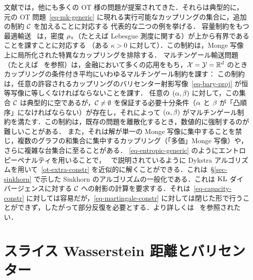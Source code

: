 文献では，他にも多くの OT 様の問題が提案されてきた．それらは典型的に，元の OT 問題~\eqref{eq-mk-generic} に現れる実行可能なカップリングの集合に，追加の制約 $\mathcal{C}$ を加えることに対応する
代表的な二つの例を挙げる．
%
容量制約をもつ最適輸送~\citep{km1} は，密度 $\rho_{\pi}$（たとえば Lebesgue 測度に関する）が上から有界であることを課すことに対応する
\eql{\label{eq-capacity-constr}
	\Cc = \enscond{ \pi }{ \density{\pi} \leq \kappa }
}
（ある $\kappa>0$ に対して）．この制約は，Monge 写像上に局所化された特異なカップリングを排除する．
%
マルチンゲール輸送問題（たとえば~\citet{GalichonMartingale,dolinsky2014martingale,TanTouzi,beiglbock2013model} を参照）は，金融において多くの応用をもち，$\mathcal{X}=\mathcal{Y}=\mathbb{R}^d$ のときカップリングの条件付き平均にいわゆるマルチンゲール制約を課す：
この制約は，任意の許容されるカップリングのバリセンター射影写像~\eqref{eq-bary-proj} が恒等写像に等しくなければならないことを課す．
%
任意の $(\alpha,\beta)$ に対して，この集合 $\mathcal{C}$ は典型的に空であるが，$\mathcal{C} \neq \emptyset$ を保証する必要十分条件（$\alpha$ と $\beta$ が「凸順序」になければならない）が存在し，それによって $(\alpha,\beta)$ がマルチンゲール制約を満たす．この制約は，既存の問題を離散化するとき，数値的に強制するのが難しいことがある．
%
また，それは解が単一の Monge 写像に集中することを禁じ，複数のグラフの和集合に集中するカップリング（「多価」Monge 写像）や，さらに複雑な台集合に至ることがある．
%
\eqref{eq-entropic-generic} のようにエントロピーペナルティを用いることで，~\citet{2015-benamou-cisc} で説明されているように Dykstra アルゴリズムを用いて~\eqref{ot-extra-constr} を近似的に解くことができる．これは~\S\ref{sec-sinkhorn} で示した Sinkhorn のアルゴリズムの一般化である．これは $\operatorname{KL}$ ダイバージェンスに対する $\mathcal{C}$ への射影の計算を要求する．それは~\eqref{eq-capacity-constr} に対しては容易だが，\eqref{eq-martingale-constr} に対しては閉じた形で行うことができず，したがって部分反復を必要とする．より詳しくは~\citep{guo2017computational} を参照されたい．


\section{スライス Wasserstein 距離とバリセンター}\label{sec-sliced}


